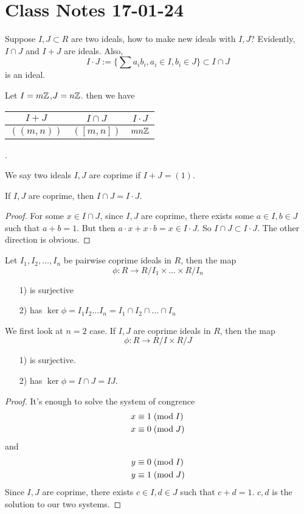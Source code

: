 \documentclass{mynotes}
\begin{document}
\section{Class Notes 17-01-24}
Suppose $I,J\subset R$ are two ideals, how to make new ideals with $I,J$? Evidently, $I\cap J$ and $I+J$ are ideals. Also,
$$I\cdot J:=\{\sum a_i b_i, a_i\in I, b_i\in J\}\subset I\cap J$$ is an ideal. 
\begin{example}
Let $I=m\mathbb{Z}$,$J=n\mathbb{Z}$. then we have \quad\begin{tabular}{|c|c|c|}\hline
$I+J$ & $I\cap J$ & $I\cdot J$\\\hline
$((m,n))$ & $([m,n])$ & $mn\mathbb{Z}$\\\hline
\end{tabular}.
\end{example}
\begin{definition}
We say two ideals $I,J$ are coprime if $I+J=(1)$.
\end{definition}
\begin{remark}
If $I, J$ are coprime, then $I\cap J = I\cdot J$.
\end{remark}
\begin{proof}
For some $x\in I\cap J$, since $I,J$ are coprime, there exists some $a\in I, b\in J$ such that $a+b = 1$. But then $a\cdot x + x\cdot b = x\in I\cdot J$. So $I\cap J \subset I\cdot J$. The other direction is obvious.
\end{proof}
\begin{theorem}
Let $I_1, I_2, \ldots, I_n$ be pairwise coprime ideals in $R$, then the map
$$\phi: R\rightarrow R/I_1\times \ldots \times R/I_n$$
\begin{itemize}
\item[1)] is surjective
\item[2)] has $\ker\phi = I_1I_2\ldots I_n = I_1\cap I_2\cap \ldots \cap I_n$
\end{itemize}
\end{theorem}
\begin{lemma}
We first look at $n=2$ case. If $I,J$ are coprime ideals in $R$, then the map
$$\phi: R\rightarrow R/I \times R/J$$
\begin{itemize}
\item[1)] is surjective.
\item[2)] has $\ker\phi = I\cap J = IJ$.
\end{itemize}
\end{lemma}
\begin{proof}
It's enough to solve the system of congrence
\begin{align*}
x&\equiv 1\;(\mbox{mod}{\;I})\\
x&\equiv 0\;(\mbox{mod}{\;J})
\end{align*} and \begin{align*}
y&\equiv 0\;(\mbox{mod}{\;I})\\
y&\equiv 1\;(\mbox{mod}{\;J})
\end{align*}
Since $I,J$ are coprime, there exists $c\in I, d\in J$ such that $c+d = 1$. $c, d$ is the solution to our two systems.
\end{proof}
\end{document}
